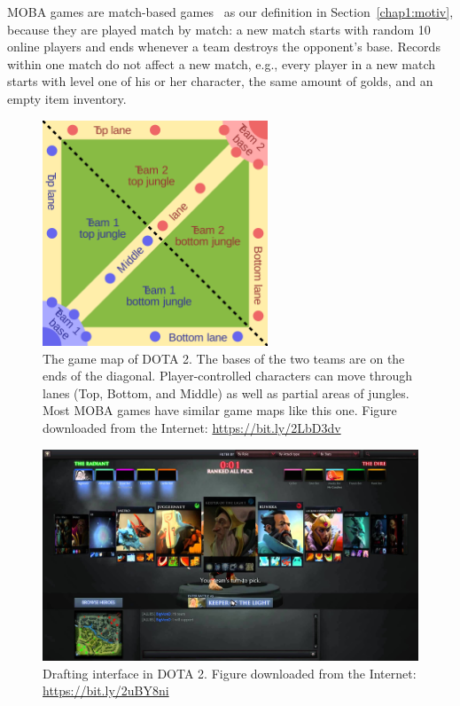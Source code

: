 MOBA games are match-based games~\citep{guo2012analysis} as our definition in Section~\ref{chap1:motiv}, because they are played match by match: a new match starts with random 10 online players and ends whenever a team destroys the opponent's base. Records  within one match do not affect a new match, e.g., every player in a new match starts with level one of his or her character, the same amount of golds, and an empty item inventory.


\begin{figure}
\centering
\includegraphics[width=0.6\textwidth]{Figures/map_of_dota.png}
\caption{The game map of DOTA 2. The bases of the two teams are on the ends of the diagonal. Player-controlled characters can move through lanes (Top, Bottom, and Middle) as well as partial areas of jungles. Most MOBA games have similar game maps like this one. Figure downloaded from the Internet: \url{https://bit.ly/2LbD3dv}}
\label{fig:moba_map}
\end{figure}

\begin{figure}
\centering
\includegraphics[width=1\textwidth]{Figures/ranked_all_pick.jpg}
\caption{Drafting interface in DOTA 2. Figure downloaded from the Internet: \url{https://bit.ly/2uBY8ni}}
\label{fig:ranked_all_pick_interface}
\end{figure}


